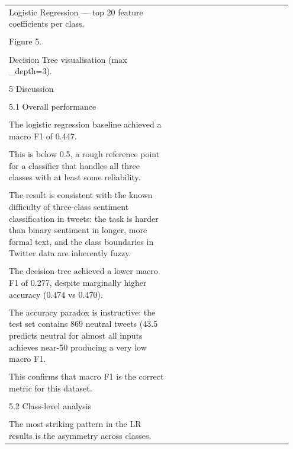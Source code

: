 \documentclass[11pt]{article}
\begin{document}
\begin{longtable}{|p{0.55\linewidth}|p{0.40\linewidth}|}
\hline
\rule{0pt}{3.5cm} & \\
\hline
Logistic Regression --- top 20 feature coefficients per class. & \\[2pt]
\hline
\rule{0pt}{3.5cm} & \\
\hline
Figure 5. & \\[2pt]
\hline
\rule{0pt}{3.5cm} & \\
\hline
Decision Tree visualisation (max \_depth=3). & \\[2pt]
\hline
\rule{0pt}{3.5cm} & \\
\hline
5 Discussion & \\[2pt]
\hline
\rule{0pt}{3.5cm} & \\
\hline
5.1 Overall performance & \\[2pt]
\hline
\rule{0pt}{3.5cm} & \\
\hline
The logistic regression baseline achieved a macro F1 of 0.447. & \\[2pt]
\hline
\rule{0pt}{3.5cm} & \\
\hline
This is below 0.5, a rough reference point for a classifier that handles all three classes with at least some reliability. & \\[2pt]
\hline
\rule{0pt}{3.5cm} & \\
\hline
The result is consistent with the known difficulty of three-class sentiment classification in tweets: the task is harder than binary sentiment in longer, more formal text, and the class boundaries in Twitter data are inherently fuzzy. & \\[2pt]
\hline
\rule{0pt}{3.5cm} & \\
\hline
The decision tree achieved a lower macro F1 of 0.277, despite marginally higher accuracy (0.474 vs 0.470). & \\[2pt]
\hline
\rule{0pt}{3.5cm} & \\
\hline
The accuracy paradox is instructive: the test set contains 869 neutral tweets (43.5 predicts neutral for almost all inputs achieves near-50 producing a very low macro F1. & \\[2pt]
\hline
\rule{0pt}{3.5cm} & \\
\hline
This confirms that macro F1 is the correct metric for this dataset. & \\[2pt]
\hline
\rule{0pt}{3.5cm} & \\
\hline
5.2 Class-level analysis & \\[2pt]
\hline
\rule{0pt}{3.5cm} & \\
\hline
The most striking pattern in the LR results is the asymmetry across classes. & \\[2pt]

\end{longtable}
\end{document}

